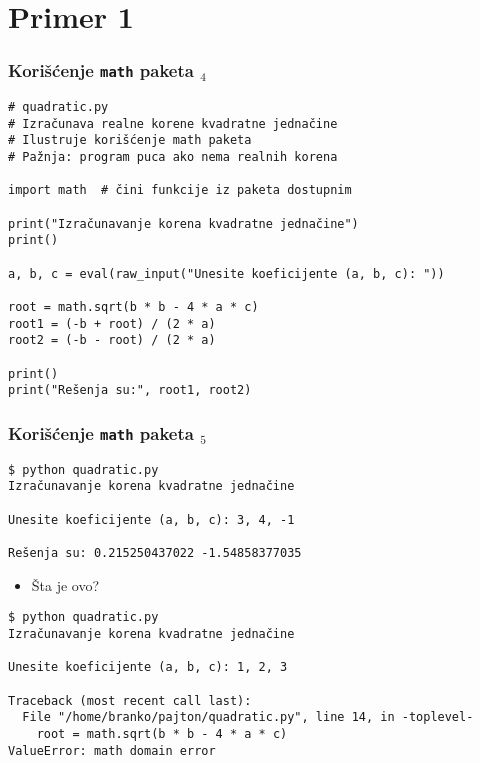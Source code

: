 \documentclass[utf8,compress]{beamer}
\begin{document}
\section{Primer 1}

\begin{frame}[fragile,shrink=5]
  \frametitle{Korišćenje \texttt{math} paketa $_4$}
\begin{verbatim}
# quadratic.py
# Izračunava realne korene kvadratne jednačine
# Ilustruje korišćenje math paketa
# Pažnja: program puca ako nema realnih korena

import math  # čini funkcije iz paketa dostupnim

print("Izračunavanje korena kvadratne jednačine")
print()

a, b, c = eval(raw_input("Unesite koeficijente (a, b, c): "))

root = math.sqrt(b * b - 4 * a * c)
root1 = (-b + root) / (2 * a)
root2 = (-b - root) / (2 * a)

print()
print("Rešenja su:", root1, root2)
\end{verbatim}
\end{frame}

\begin{frame}[fragile,shrink=5]
  \frametitle{Korišćenje \texttt{math} paketa $_5$}
\begin{verbatim}
$ python quadratic.py
Izračunavanje korena kvadratne jednačine

Unesite koeficijente (a, b, c): 3, 4, -1

Rešenja su: 0.215250437022 -1.54858377035
\end{verbatim}
  \begin{itemize}
    \item Šta je ovo?
  \end{itemize}
\begin{verbatim}
$ python quadratic.py
Izračunavanje korena kvadratne jednačine

Unesite koeficijente (a, b, c): 1, 2, 3

Traceback (most recent call last):
  File "/home/branko/pajton/quadratic.py", line 14, in -toplevel-
    root = math.sqrt(b * b - 4 * a * c)
ValueError: math domain error
\end{verbatim}

\end{frame}

\end{document}
